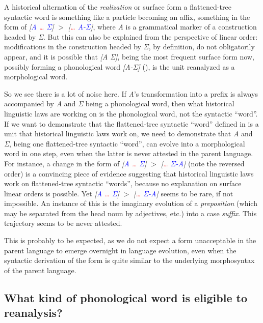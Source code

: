 \documentclass[a4paper, oneside, scheme=plain, 12pt]{article}
\newcommand{\form}[1]{\emph{#1}}
\newcommand*{\textgt}{$>$ }
\begin{document}
A historical alternation of the \emph{realization} or surface form a flattened-tree syntactic word is something like a particle becoming an affix, 
something in the form of \form{[\textcolor{blue}{A} \textcolor{red}{\dots} \textcolor{blue}{Σ}]} \textgt \form{[\textcolor{red}{\dots} \textcolor{blue}{A-Σ}]},
where \form{A} is a grammatical marker of a construction headed by \form{Σ}.
But this can also be explained from the perspective of linear order:
modifications in the construction headed by \form{Σ}, by definition, do not obligatorily appear,
and it is possible that \form{[A Σ]}, being the most frequent surface form now, possibly forming a phonological word \form{[A-Σ]} (), is the unit reanalyzed as a morphological word.

So we see there is a lot of noise here.
If \form{A}'s transformation into a prefix is always accompanied by \form{A} and \form{Σ} being a phonological word,
then what historical linguistic laws are working on is the phonological word,
not the syntactic ``word''.
If we want to demonstrate that the flattened-tree syntactic ``word'' defined in 
is a unit that historical linguistic laws work on,
we need to demonstrate that \form{A} and \form{Σ}, being one flattened-tree syntactic ``word'', can evolve into a morphological word in one step,
even when the latter is never attested in the parent language.
For instance, a change in the form of \form{[\textcolor{blue}{A} \textcolor{red}{\dots} \textcolor{blue}{Σ}]} \textgt \form{[\textcolor{red}{\dots} \textcolor{blue}{Σ-A}]} (note the reversed order)
is a convincing piece of evidence suggesting that historical linguistic laws work on flattened-tree syntactic ``words'',
because no explanation on surface linear orders is possible.
Yet \form{[\textcolor{blue}{A} \textcolor{red}{\dots} \textcolor{blue}{Σ}]} \textgt \form{[\textcolor{red}{\dots} \textcolor{blue}{Σ-A}]} seems to be rare, if not impossible.
An instance of this is the imaginary evolution of a \emph{preposition} (which may be separated from the head noun by adjectives, etc.) into a case \emph{suffix}.
This trajectory seems to be never attested.

This is probably to be expected, as we do not expect a form unacceptable in the parent language to emerge overnight in language evolution,
even when the syntactic derivation of the form is quite similar to the underlying morphosyntax of the parent language.

\subsection{What kind of phonological word is eligible to reanalysis?}\label{sec:phonological-word-reanalysis-condition}
\end{document}
